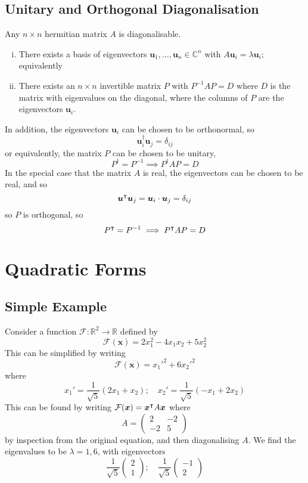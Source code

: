 \documentclass{article}
\begin{document}
\subsection{Unitary and Orthogonal Diagonalisation}
\begin{theorem}
	Any $n\times n$ hermitian matrix $A$ is diagonalisable.
	\begin{enumerate}[(i)]
		\item There exists a basis of eigenvectors $\bm u_1, \dots, \bm u_n \in \mathbb C^n$ with $A\bm u_i = \lambda \bm u_i$; equivalently
		\item There exists an $n \times n$ invertible matrix $P$ with $P^{-1}AP = D$ where $D$ is the matrix with eigenvalues on the diagonal, where the columns of $P$ are the eigenvectors $\bm u_i$.
	\end{enumerate}
	In addition, the eigenvectors $\bm u_i$ can be chosen to be orthonormal, so
	\[ \bm u^\dagger_i \bm u_j = \delta_{ij} \]
	or equivalently, the matrix $P$ can be chosen to be unitary,
	\[ P^\dagger = P^{-1} \implies P^\dagger AP = D \]
	In the special case that the matrix $A$ is real, the eigenvectors can be chosen to be real, and so
	\[ \bm u^\intercal \bm u_j = \bm u_i \cdot \bm u_j = \delta_{ij} \]
	so $P$ is orthogonal, so
	\[ P^\intercal = P^{-1} \implies P^\intercal AP = D \]
\end{theorem}

\section{Quadratic Forms}
\subsection{Simple Example}
Consider a function $\mathcal F\colon \mathbb R^2 \to \mathbb R$ defined by
\[ \mathcal F(\bm x) = 2x_1^2 - 4x_1x_2 + 5x_2^2 \]
This can be simplified by writing
\[ \mathcal F(\bm x) = x_1'^2 + 6x_2'^2 \]
where
\[ x_1' = \frac{1}{\sqrt 5}(2x_1 + x_2);\quad x_2' = \frac{1}{\sqrt 5}(-x_1 + 2x_2) \]
This can be found by writing $\mathcal F(\bm x) = \bm x^\intercal A\bm x$ where
\[ A = \begin{pmatrix}
		2 & -2 \\ -2 & 5
	\end{pmatrix} \]
by inspection from the original equation, and then diagonalising $A$. We find the eigenvalues to be $\lambda = 1, 6$, with eigenvectors
\[ \frac{1}{\sqrt 5} \begin{pmatrix}
		2 \\ 1
	\end{pmatrix};\quad \frac{1}{\sqrt 5}\begin{pmatrix}
		-1 \\ 2
	\end{pmatrix} \]
\end{document}
